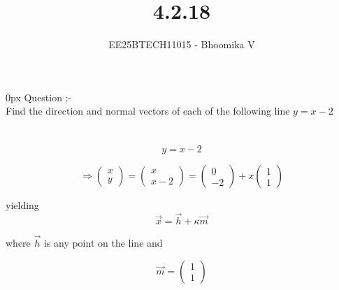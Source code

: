 \documentclass[journal]{IEEEtran}
\begin{document}

\vspace{3cm}

\title{4.2.18}
\author{EE25BTECH11015 - Bhoomika V}
{\let\newpage\relax\maketitle}

\renewcommand{\thefigure}{\theenumi}
\renewcommand{\thetable}{\theenumi}
\setlength{\intextsep}{10pt} %


\renewcommand{\thetable}{\theenumi}
\parindent 0px 
{Question :-} \\ 
Find the direction and normal vectors of each of the following line $y = x - 2$ \\ \\ 


\solution \\
\begin{equation}
y = x - 2
\tag{4.2.18.1}
\end{equation}

\[
\Rightarrow
\begin{pmatrix}
x \\ y
\end{pmatrix}
=
\begin{pmatrix}
x \\ x-2
\end{pmatrix}
=
\begin{pmatrix}
0 \\ -2
\end{pmatrix}
+ x
\begin{pmatrix}
1 \\ 1
\end{pmatrix}
\tag{4.2.18.2}
\]

yielding
\begin{equation}
\vec{x} = \vec{h} + \kappa \vec{m}
\tag{4.2.18.3}
\end{equation}

where $\vec{h}$ is any point on the line and  

\[
\vec{m} =
\begin{pmatrix}
1 \\ 1
\end{pmatrix}
\tag{4.2.18.4}
\]
\end{document}
